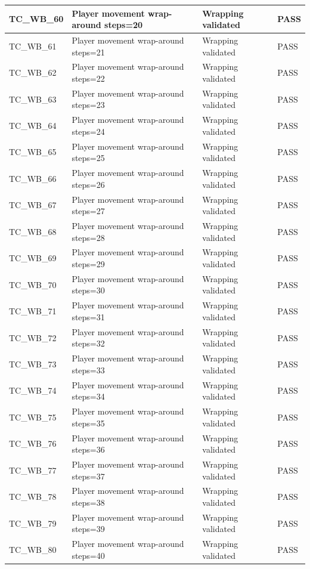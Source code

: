 \documentclass{article}
\begin{document}
\begin{longtable}{|p{2cm}|p{8cm}|p{3cm}|p{2cm}|}
\hline
TC\_WB\_60 & Player movement wrap-around steps=20 & Wrapping validated & PASS \\
\hline
TC\_WB\_61 & Player movement wrap-around steps=21 & Wrapping validated & PASS \\
\hline
TC\_WB\_62 & Player movement wrap-around steps=22 & Wrapping validated & PASS \\
\hline
TC\_WB\_63 & Player movement wrap-around steps=23 & Wrapping validated & PASS \\
\hline
TC\_WB\_64 & Player movement wrap-around steps=24 & Wrapping validated & PASS \\
\hline
TC\_WB\_65 & Player movement wrap-around steps=25 & Wrapping validated & PASS \\
\hline
TC\_WB\_66 & Player movement wrap-around steps=26 & Wrapping validated & PASS \\
\hline
TC\_WB\_67 & Player movement wrap-around steps=27 & Wrapping validated & PASS \\
\hline
TC\_WB\_68 & Player movement wrap-around steps=28 & Wrapping validated & PASS \\
\hline
TC\_WB\_69 & Player movement wrap-around steps=29 & Wrapping validated & PASS \\
\hline
TC\_WB\_70 & Player movement wrap-around steps=30 & Wrapping validated & PASS \\
\hline
TC\_WB\_71 & Player movement wrap-around steps=31 & Wrapping validated & PASS \\
\hline
TC\_WB\_72 & Player movement wrap-around steps=32 & Wrapping validated & PASS \\
\hline
TC\_WB\_73 & Player movement wrap-around steps=33 & Wrapping validated & PASS \\
\hline
TC\_WB\_74 & Player movement wrap-around steps=34 & Wrapping validated & PASS \\
\hline
TC\_WB\_75 & Player movement wrap-around steps=35 & Wrapping validated & PASS \\
\hline
TC\_WB\_76 & Player movement wrap-around steps=36 & Wrapping validated & PASS \\
\hline
TC\_WB\_77 & Player movement wrap-around steps=37 & Wrapping validated & PASS \\
\hline
TC\_WB\_78 & Player movement wrap-around steps=38 & Wrapping validated & PASS \\
\hline
TC\_WB\_79 & Player movement wrap-around steps=39 & Wrapping validated & PASS \\
\hline
TC\_WB\_80 & Player movement wrap-around steps=40 & Wrapping validated & PASS \\

\end{longtable}
\end{document}
